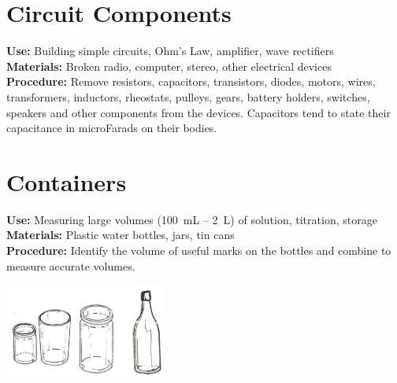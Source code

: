 \begin{multicols}{2}
\columnbreak

\section{Circuit Components} 
\label{sec:circuit-comp}
\vspace{-10pt}
\textbf{Use:} Building simple circuits, Ohm's Law, amplifier, wave rectifiers\\
\textbf{Materials:} Broken radio, computer, stereo, other electrical devices\\
\textbf{Procedure:} Remove resistors, capacitors, transistors, diodes, motors, wires, transformers, inductors, rheostats, pulleys, gears, battery holders, switches, speakers and other components from the devices. Capacitors tend to state their capacitance in microFarads on their bodies.


\section{Containers} 
\label{sec:containers}
\vspace{-10pt}
\textbf{Use:} Measuring large volumes (100~mL -- 2~L) of solution, titration, storage\\
\textbf{Materials:} Plastic water bottles, jars, tin cans\\
\textbf{Procedure:} Identify the volume of useful marks on the bottles 
and combine to measure accurate volumes.
\begin{center}
\includegraphics[width=0.4\textwidth]{./img/source/volumetric.jpg}
\end{center}


\end{multicols}
